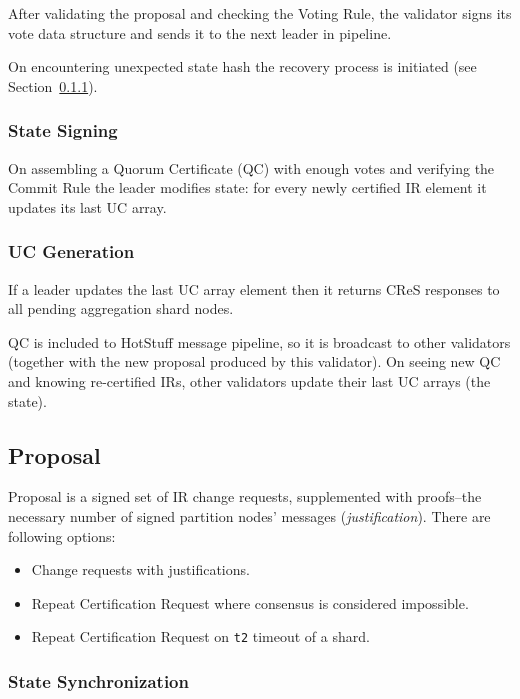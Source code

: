 After validating the proposal and checking the Voting Rule, the validator signs its vote data structure and sends it to the next leader in pipeline.

On encountering unexpected state hash the recovery process is initiated (see Section~\ref{root-recovery-procedure}).

\subsubsection{State Signing}

On assembling a Quorum Certificate (QC) with enough votes and verifying the Commit Rule the leader modifies state: for every newly certified IR element it updates its last UC array.

\subsubsection{UC Generation}

If a leader updates the last UC array element then it returns CReS responses to all pending aggregation shard nodes.

QC is included to HotStuff message pipeline, so it is broadcast to other validators (together with the new proposal produced by this validator). On seeing new QC and knowing re-certified IRs, other validators update their last UC arrays (the state).


\subsection{Proposal}

Proposal is a signed set of IR change requests, supplemented with proofs--the necessary number of signed partition nodes' messages (\textit{justification}). There are following options:
\begin{itemize}
  \item Change requests with justifications.
  \item Repeat Certification Request where consensus is considered impossible.
  \item Repeat Certification Request on \texttt{t2} timeout of a shard.
\end{itemize}


\subsubsection{State Synchronization}\label{root-recovery-procedure}

